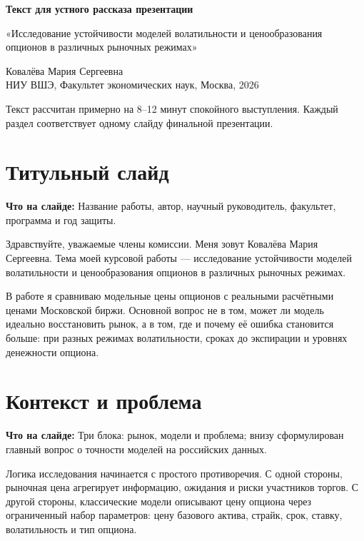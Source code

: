 \documentclass[11pt,a4paper]{article}
\newcommand{\whatsonslide}[1]{%
  \noindent\colorbox{softblue}{%
    \parbox{\dimexpr\linewidth-2\fboxsep\relax}{\textbf{Что на слайде:} #1}%
  }\par\vspace{0.2em}
}
\begin{document}
\begin{center}
{\Large\bfseries Текст для устного рассказа презентации\par}
\vspace{0.35em}
{\large «Исследование устойчивости моделей волатильности и ценообразования опционов в различных рыночных режимах»\par}
\vspace{0.45em}
Ковалёва Мария Сергеевна \\
НИУ ВШЭ, Факультет экономических наук, Москва, 2026
\end{center}

\vspace{0.5em}
Текст рассчитан примерно на 8--12 минут спокойного выступления. Каждый раздел соответствует одному слайду финальной презентации.

\tableofcontents
\newpage

\section{Титульный слайд}

\whatsonslide{Название работы, автор, научный руководитель, факультет, программа и год защиты.}

Здравствуйте, уважаемые члены комиссии. Меня зовут Ковалёва Мария Сергеевна. Тема моей курсовой работы --- исследование устойчивости моделей волатильности и ценообразования опционов в различных рыночных режимах.

В работе я сравниваю модельные цены опционов с реальными расчётными ценами Московской биржи. Основной вопрос не в том, может ли модель идеально восстановить рынок, а в том, где и почему её ошибка становится больше: при разных режимах волатильности, сроках до экспирации и уровнях денежности опциона.

\section{Контекст и проблема}

\whatsonslide{Три блока: рынок, модели и проблема; внизу сформулирован главный вопрос о точности моделей на российских данных.}

Логика исследования начинается с простого противоречия. С одной стороны, рыночная цена агрегирует информацию, ожидания и риски участников торгов. С другой стороны, классические модели описывают цену опциона через ограниченный набор параметров: цену базового актива, страйк, срок, ставку, волатильность и тип опциона.
\end{document}
